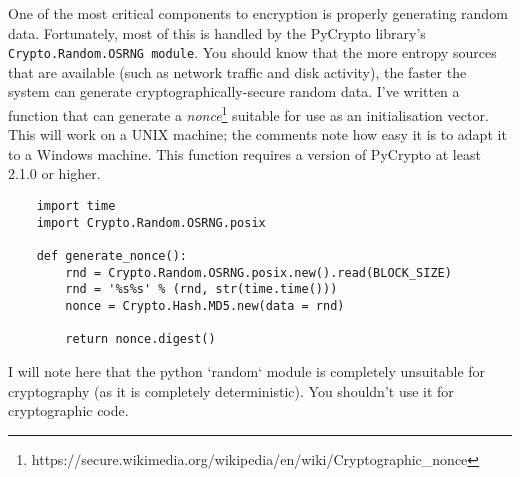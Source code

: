 \documentclass[letterpaper,10pt]{article}
\begin{document}
One of the most critical components to encryption is properly generating 
random data. Fortunately, most of this is handled by the PyCrypto library's
\verb|Crypto.Random.OSRNG module|. You should know that the more entropy sources
that are available (such as network traffic and disk activity), the faster the system
can generate cryptographically-secure random data. I've written a function that 
can generate a \textit{nonce}\footnote{https://secure.wikimedia.org/wikipedia/en/wiki/Cryptographic\_nonce} 
suitable for use as an initialisation vector. This will work on a UNIX machine; 
the comments note how easy it is to adapt it to a Windows machine. This 
function requires a version of PyCrypto at least 2.1.0 or higher.
\begin{verbatim}
    import time
    import Crypto.Random.OSRNG.posix

    def generate_nonce():
        rnd = Crypto.Random.OSRNG.posix.new().read(BLOCK_SIZE)
        rnd = '%s%s' % (rnd, str(time.time()))
        nonce = Crypto.Hash.MD5.new(data = rnd)
    
        return nonce.digest()
\end{verbatim}
I will note here that the python `random` module is completely unsuitable for
cryptography (as it is completely deterministic). You shouldn't use it for
cryptographic code.
\end{document}
